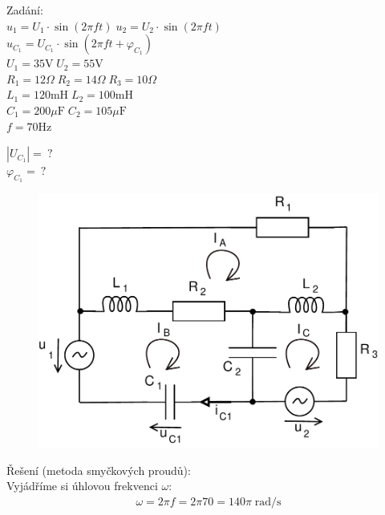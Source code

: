 \documentclass[12pt,a4paper]{article}
\begin{document}
	{\Large Zadání:} \\
	$u_1 = U_1 \cdot \sin(2 \pi f t) \; u_2 = U_2 \cdot \sin(2 \pi f t)$ \\
	$u_{C_1} = U_{C_1} \cdot \sin(2 \pi f t + \varphi_{C_1})$ \\
	$U_1 = 35 \text{V} \; U_2 = 55 \text{V}$ \\
	$R_1 = 12 \Omega \; R_2 = 14 \Omega \; R_3 = 10 \Omega$ \\
	$L_1 = 120 \text{mH} \; L_2 = 100 \text{mH}$ \\
	$C_1 = 200 \mu \text{F} \; C_2 = 105 \mu \text{F}$ \\
	$f = 70 \text{Hz}$

	$|U_{C_1}| = \: \text{?}$ \\
	$\varphi_{C_1} = \: \text{?}$ \\

	\begin{figure}[H] 
		\vspace{-1.1cm}
		\center\includegraphics[width=0.6\linewidth]{obr/4_1}
	\end{figure}

	{\Large Řešení (metoda smyčkových proudů):} \\

	Vyjádříme si úhlovou frekvenci $\omega$:
	\begin{gather*}
		\omega = 2 \pi f = 2 \pi 70 = 140 \pi \; \text{rad/s}
	\end{gather*}
\end{document}
